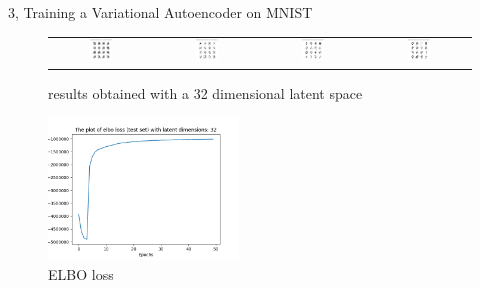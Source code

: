 \documentclass[10pt,a4paper]{article}
\begin{document}
\begin{task}{3, Training a Variational Autoencoder on MNIST}
\begin{enumerate}
\begin{figure}[H]
\caption{results obtained with a 32 dimensional latent space}
\label{fig:latent-32} 
\begin{tabular}{cccc}
	\includegraphics[width=0.23\textwidth]{../plots/task3/generated_epochs1_latent32.png} &   \includegraphics[width=0.23\textwidth]{../plots/task3/generated_epochs5_latent32.png} & \includegraphics[width=0.23\textwidth]{../plots/task3/generated_epochs25_latent32.png} &   \includegraphics[width=0.23\textwidth]{../plots/task3/generated_epochs50_latent32.png} \\
\end{tabular}
\end{figure}

	\begin{figure}[H]
		\caption{ELBO loss}
		\label{fig:loss-latent-32}
		\centering
		\includegraphics[width=0.45\textwidth]{../plots/task3/loss_elbo_latent32.png}
	\end{figure}

\end{enumerate}
	
\end{task}
\end{document}
